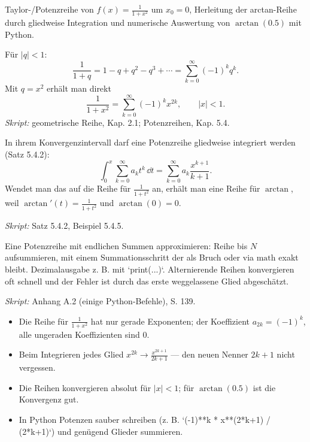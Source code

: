 

Taylor-/Potenzreihe von $f(x)=\frac1{1+x^2}$ um $x_0=0$, Herleitung der
arctan-Reihe durch gliedweise Integration und numerische Auswertung von
$\arctan(0.5)$ mit Python.

\begin{werkzeugkasten}
Für $|q|<1$:
\begin{equation}
  \frac1{1+q}=1-q+q^2-q^3+\cdots=\sum_{k=0}^{\infty}(-1)^k q^k .
\end{equation}
Mit $q=x^2$ erhält man direkt
\begin{equation}
  \frac1{1+x^2}=\sum_{k=0}^{\infty}(-1)^k x^{2k},
  \qquad|x|<1 .
\end{equation}
\textit{Skript:} geometrische Reihe, Kap. 2.1; Potenzreihen, Kap. 5.4.
\end{werkzeugkasten}

\begin{werkzeugkasten}
In ihrem Konvergenzintervall darf eine Potenzreihe gliedweise integriert
werden (Satz 5.4.2):
\begin{equation}
  \int_0^x \sum_{k=0}^{\infty}a_k t^k\,\dd t
  = \sum_{k=0}^{\infty}a_k\frac{x^{k+1}}{k+1}.
\end{equation}
Wendet man das auf die Reihe für $\frac1{1+t^2}$ an, erhält man eine Reihe für
$\arctan$, weil $\arctan'(t)=\frac1{1+t^2}$ und $\arctan(0)=0$.

\textit{Skript:} Satz 5.4.2, Beispiel 5.4.5.
\end{werkzeugkasten}

\begin{werkzeugkasten}
Eine Potenzreihe mit endlichen Summen approximieren: Reihe bis $N$ aufsummieren,
mit einem Summationsschritt der als Bruch oder via $\mathrm{math}$ exakt bleibt.
Dezimalausgabe z. B. mit `print(...)`. Alternierende Reihen konvergieren oft
schnell und der Fehler ist durch das erste weggelassene Glied abgeschätzt.

\textit{Skript:} Anhang A.2 (einige Python-Befehle), S. 139.
\end{werkzeugkasten}

\begin{achtung}
\begin{itemize}
  \item Die Reihe für $\frac1{1+x^2}$ hat nur gerade Exponenten; der
        Koeffizient $a_{2k}=(-1)^k$, alle ungeraden Koeffizienten sind $0$.
  \item Beim Integrieren jedes Glied $x^{2k}\to\frac{x^{2k+1}}{2k+1}$ — den
        neuen Nenner $2k+1$ nicht vergessen.
  \item Die Reihen konvergieren absolut für $|x|<1$; für $\arctan(0.5)$ ist
        die Konvergenz gut.
  \item In Python Potenzen sauber schreiben (z. B. `(-1)**k * x**(2*k+1) /
        (2*k+1)`) und genügend Glieder summieren.
\end{itemize}
\end{achtung}
